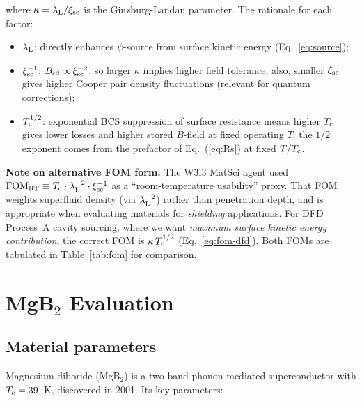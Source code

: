 \documentclass[11pt]{article}
\newcommand{\lambdaL}{\lambda_{\rm L}}
\newcommand{\xsc}{\xi_{\rm sc}}
\newcommand{\Tc}{T_{\rm c}}
\newcommand{\FOM}{\mathrm{FOM}}
\begin{document}
where $\kappa = \lambdaL / \xsc$ is the Ginzburg-Landau parameter. The
rationale for each factor:

\begin{itemize}
\item $\lambdaL$: directly enhances $\psi$-source from surface kinetic
  energy (Eq.~\ref{eq:source});
\item $\xsc^{-1}$: $B_{c2} \propto \xsc^{-2}$, so larger $\kappa$ implies
  higher field tolerance; also, smaller $\xsc$ gives higher Cooper pair
  density fluctuations (relevant for quantum corrections);
\item $\Tc^{1/2}$: exponential BCS suppression of surface resistance
  means higher $\Tc$ gives lower losses and higher stored $B$-field at
  fixed operating $T$; the $1/2$ exponent comes from the prefactor of
  Eq.~(\ref{eq:Rs}) at fixed $T/\Tc$.
\end{itemize}

\begin{mdframed}[backgroundcolor=gray!5]
\textbf{Note on alternative FOM form.} The W3i3 MatSci agent used
$\FOM_{\rm RT} \equiv \Tc \cdot \lambdaL^{-2} \cdot \xsc^{-1}$ as a
``room-temperature usability'' proxy. That FOM weights superfluid density
(via $\lambdaL^{-2}$) rather than penetration depth, and is appropriate when
evaluating materials for \emph{shielding} applications. For DFD Process~A
cavity sourcing, where we want \emph{maximum surface kinetic energy
contribution}, the correct FOM is $\kappa\,\Tc^{1/2}$ (Eq.~\ref{eq:fom-dfd}).
Both FOMs are tabulated in Table~\ref{tab:fom} for comparison.
\end{mdframed}

\section{MgB$_2$ Evaluation}
\label{sec:mgb2}

\subsection{Material parameters}

Magnesium diboride (MgB$_2$) is a two-band phonon-mediated superconductor
with $\Tc = 39$~K, discovered in 2001. Its key parameters:
\end{document}
